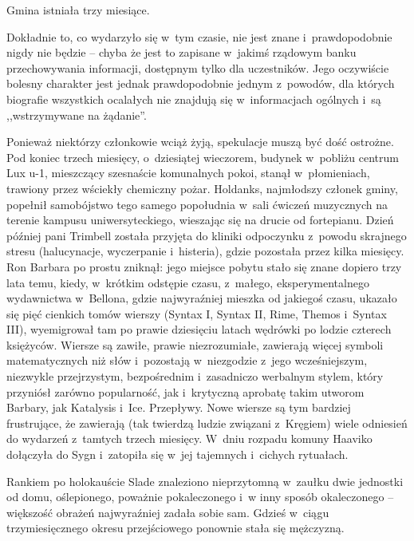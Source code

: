 \documentclass[oneside,polish,11pt,rmheadings]{mwbk}
\begin{document}
Gmina istniała trzy miesiące. 

Dokładnie to, co wydarzyło się w~tym czasie, nie jest znane i~prawdopodobnie nigdy nie będzie -- chyba że jest to zapisane w~jakimś rządowym banku przechowywania informacji, dostępnym tylko dla uczestników. Jego oczywiście bolesny charakter jest jednak prawdopodobnie jednym z~powodów, dla których biografie wszystkich ocalałych nie znajdują się w~informacjach ogólnych i~są ,,wstrzymywane na żądanie''. 

Ponieważ niektórzy członkowie wciąż żyją, spekulacje muszą być dość ostrożne. Pod koniec trzech miesięcy, o~dziesiątej wieczorem, budynek w~pobliżu centrum Lux u-1, mieszczący szesnaście komunalnych pokoi, stanął w~płomieniach, trawiony przez wściekły chemiczny pożar. Holdanks, najmłodszy członek gminy, popełnił samobójstwo tego samego popołudnia w~sali ćwiczeń muzycznych na terenie kampusu uniwersyteckiego, wieszając się na drucie od fortepianu. Dzień później pani Trimbell została przyjęta do kliniki odpoczynku z~powodu skrajnego stresu (halucynacje, wyczerpanie i~histeria), gdzie pozostała przez kilka miesięcy. Ron Barbara po prostu zniknął: jego miejsce pobytu stało się znane dopiero trzy lata temu, kiedy, w~krótkim odstępie czasu, z~małego, eksperymentalnego wydawnictwa w~Bellona, gdzie najwyraźniej mieszka od jakiegoś czasu, ukazało się pięć cienkich tomów wierszy (Syntax I, Syntax II, Rime, Themos i~Syntax III), wyemigrował tam po prawie dziesięciu latach wędrówki po lodzie czterech księżyców. Wiersze są zawiłe, prawie niezrozumiałe, zawierają więcej symboli matematycznych niż słów i~pozostają w~niezgodzie z~jego wcześniejszym, niezwykle przejrzystym, bezpośrednim i~zasadniczo werbalnym stylem, który przyniósł zarówno popularność, jak i~krytyczną aprobatę takim utworom Barbary, jak Katalysis i~Ice. Przepływy. Nowe wiersze są tym bardziej frustrujące, że zawierają (tak twierdzą ludzie związani z~Kręgiem) wiele odniesień do wydarzeń z~tamtych trzech miesięcy. W~dniu rozpadu komuny Haaviko dołączyła do Sygn i~zatopiła się w~jej tajemnych i~cichych rytuałach. 

Rankiem po holokauście Slade znaleziono nieprzytomną w~zaułku dwie jednostki od domu, oślepionego, poważnie pokaleczonego i~w inny sposób  okaleczonego -- większość obrażeń najwyraźniej zadała sobie sam.   Gdzieś w~ciągu trzymiesięcznego okresu przejściowego ponownie stała się mężczyzną. 
\end{document}
